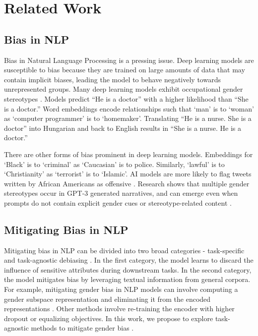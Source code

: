 \documentclass[11pt]{article}
\begin{document}
\section{Related Work}

\subsection{Bias in NLP} 

Bias in Natural Language Processing is a pressing issue. Deep learning models are susceptible to bias because they are trained on large amounts of data that may contain implicit biases, leading the model to behave negatively towards unrepresented groups. Many deep learning models exhibit occupational gender stereotypes \cite{sun-etal-2019-mitigating}. Models predict “He is a doctor” with a higher likelihood than “She is a doctor.” Word embeddings encode relationships such that `man' is to `woman' as `computer programmer' is to `homemaker'. Translating “He is a nurse. She is a doctor” into Hungarian and back to English results in “She is a nurse. He is a doctor.” 

There are other forms of bias prominent in deep learning models. Embeddings for `Black' is to `criminal' as `Caucasian' is to police. Similarly, `lawful' is to `Christianity' as `terrorist' is to `Islamic'. AI models are more likely to flag tweets written by African Americans as offensive \cite{manzini-etal-2019-black}. Research shows that multiple gender stereotypes occur in GPT-3 generated narratives, and can emerge even when prompts do not contain explicit gender cues or stereotype-related content \cite{lucy-bamman-2021-gender}.


\subsection{Mitigating Bias in NLP}

Mitigating bias in NLP can be divided into two broad categories - task-specific and task-agnostic debiasing \cite{he2022mabel}. In the first category, the model learns to discard the influence of sensitive attributes during downstream tasks. In the second category, the model mitigates bias by leveraging textual information from general corpora. For example, mitigating gender bias in NLP models can involve computing a gender subspace representation and eliminating it from the encoded representations \cite{https://doi.org/10.48550/arxiv.1607.06520}. Other methods involve re-training the encoder with higher dropout or equalizing objectives. In this work, we propose to explore task-agnostic methods to mitigate gender bias \cite{gira-etal-2022-debiasing}.
\end{document}
